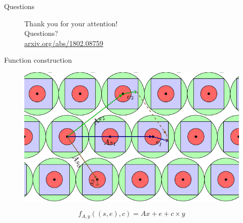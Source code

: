 \documentclass[]{beamer}
\begin{document}
\begin{frame}{Questions}
  \begin{figure}[ht]
    \centering
    Thank you for your attention!\\
    Questions?\\
    \vspace{2cm}
    \href{https://arxiv.org/abs/1802.08759}{arxiv.org/abs/1802.08759}
  \end{figure}
\end{frame}

\begin{frame}[noframenumbering]{Function construction}
  \begin{figure}[ht]
    \centering
    \includegraphics[width=.8\textwidth]{figures/example_dimension2.pdf}
  \end{figure}
  $$f_{A,y}((s,e),c) = Ax + e + c \times y$$
\end{frame}
\end{document}
